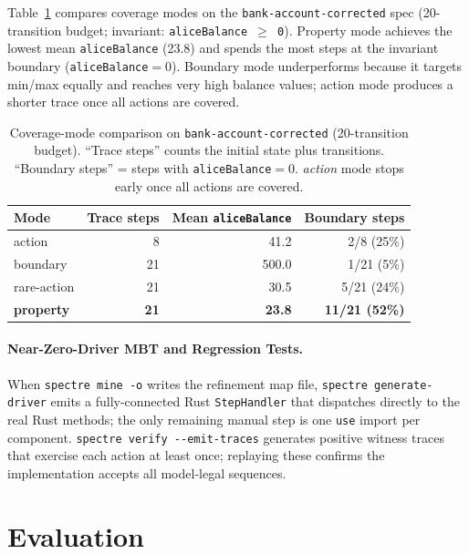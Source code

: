 \documentclass[runningheads]{llncs}
\begin{document}
Table~\ref{tab:coverage} compares coverage modes on the
\texttt{bank-account-corrected} spec (20-transition budget;
invariant: \texttt{aliceBalance\,$\ge$\,0}).
Property mode achieves the lowest mean \texttt{aliceBalance} (23.8) and
spends the most steps at the invariant boundary (\texttt{aliceBalance}$=0$).
Boundary mode underperforms because it targets min/max equally and reaches
very high balance values; action mode produces a shorter trace once all
actions are covered.

\begin{table}[h]
\caption{Coverage-mode comparison on \texttt{bank-account-corrected} (20-transition budget).
  ``Trace steps'' counts the initial state plus transitions.
  ``Boundary steps'' = steps with \texttt{aliceBalance}$=0$.
  \emph{action} mode stops early once all actions are covered.}\label{tab:coverage}
\centering
\small
\begin{tabular}{lrrr}
\toprule
Mode & Trace steps & Mean \texttt{aliceBalance} & Boundary steps \\
\midrule
action   & 8  & 41.2  & 2/8  (25\%) \\
boundary & 21 & 500.0 & 1/21 (\phantom{0}5\%) \\
rare-action & 21 & 30.5 & 5/21 (24\%) \\
\textbf{property} & \textbf{21} & \textbf{23.8} & \textbf{11/21 (52\%)} \\
\bottomrule
\end{tabular}
\end{table}

\paragraph{Near-Zero-Driver MBT and Regression Tests.}
When \texttt{spectre mine -o} writes the refinement map file,
\texttt{spectre generate-driver} emits a fully-connected Rust \texttt{StepHandler}
that dispatches directly to the real Rust methods; the only remaining manual
step is one \texttt{use} import per component.  \texttt{spectre verify
-\!\!-emit-traces} generates positive witness traces that exercise each action
at least once; replaying these confirms the implementation accepts all model-legal
sequences.

\section{Evaluation}\label{sec:eval}
\end{document}
